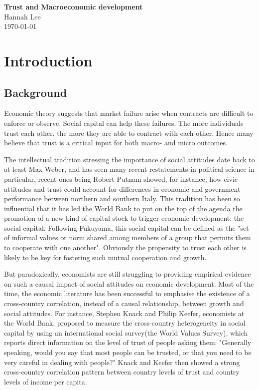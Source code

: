 \documentclass[11pt]{article}
\begin{document}
\begin{titlepage}
\begin{center}
\vspace*{1cm}
\vfill
\huge{\textbf{Trust and Macroeconomic development}}\\[3mm]
\vfill
Hannah Lee\\
\today\\
\end{center}
\end{titlepage}

\tableofcontents
\thispagestyle{empty}
\clearpage
\setcounter{page}{1}

\section{Introduction}
\subsection{Background}

Economic theory suggests that market failure arise when contracts are difficult to enforce or observe. Social capital can help these failures. The more individuals trust each other, the more they are able to contract with each other. Hence many believe that trust is a critical input for both macro- and micro outcomes.

The intellectual tradition stressing the importance of social attitudes date back to at least Max Weber, and has seen many recent restatements in political science in particular, recent ones being Robert Putnam showed, for instance, how civic attitudes and trust could account for differences in economic and government performance between northern and southern Italy. This tradition has been so influential that it has led the World Bank to put on the top of the agenda the promotion of a new kind of capital stock to trigger economic development: the social capital. Following Fukuyama, this social capital can be defined as the "set of informal values or norm shared among members of a group that permits them to cooperate with one another". Obviously the propensity to trust each other is likely to be key for fostering such mutual cooperation and growth.

But paradoxically, economists are still struggling to providing empirical evidence on such a causal impact of social attitudes on economic development. Most of the time, the economic literature has been successful to emphasise the existence of a cross-country correlation, instead of a causal relationship, between growth and social attitudes. For instance, Stephen Knack and Philip Keefer, economists at the World Bank, proposed to measure the cross-country heterogeneity in social capital by using an international social survey(the World Values Survey), which reports direct information on the level of trust of people asking them: "Generally speaking, would you say that most people can be trusted, or that you need to be very careful in dealing with people?" Knack and Keefer then showed a strong cross-country correlation pattern between country levels of trust and country levels of income per capita.
\end{document}
